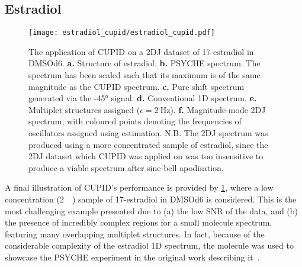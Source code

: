 \subsection{Estradiol}
\begin{figure}
    \texttt{[image: estradiol\_cupid/estradiol\_cupid.pdf]}%
    \caption[
        The application of \acs{CUPID} on a 17\textbeta-estradiol \acs{2DJ}
        dataset.
    ]{
        The application of \acs{CUPID} on a \ac{2DJ} dataset of 17\textbeta-estradiol
        in \acs{DMSOd6}.
        \textbf{a.} Structure of estradiol.
        \textbf{b.} \acs{PSYCHE} spectrum.
        The spectrum has been scaled such that its maximum is of the same
        magnitude as the \acs{CUPID} spectrum.
        \textbf{c.} Pure shift spectrum generated via the \ang{-45} signal.
        \textbf{d.} Conventional \ac{1D} spectrum.
        \textbf{e.} Multiplet structures assigned ($\epsilon =
        \qty{2}{\hertz}$).
        \textbf{f.} Magnitude-mode \ac{2DJ} spectrum, with coloured points
        denoting the frequencies of oscillators assigned using estimation.
        N.B. The \ac{2DJ} spectrum was produced using a more
        concentrated sample of estradiol, since the \ac{2DJ} dataset which
        \ac{CUPID} was applied on was too insensitive to produce a viable
        spectrum after sine-bell apodisation.
    }
    \label{fig:estradiol-cupid}%
\end{figure}

A final illustration of \ac{CUPID}'s performance is provided by
\cref{fig:estradiol-cupid},
where a low concentration (\qty{2}{\milli\molar}) sample of
17\textbeta-estradiol in \acs{DMSOd6} is
considered. This is the most challenging example presented due
to (a) the low \ac{SNR} of the data, and (b) the presence of incredibly complex
regions for a small molecule spectrum, featuring many overlapping
multiplet structures. In fact, because of the considerable complexity
of the estradiol \ac{1D} spectrum, the molecule was used to showcase the
\ac{PSYCHE} experiment in the original work describing
it~\cite{Foroozandeh2014}.

